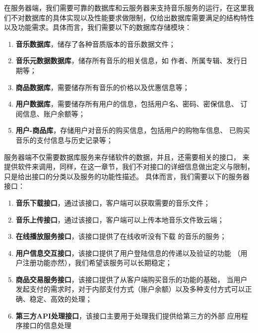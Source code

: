 在服务器端，我们需要可靠的数据库和云服务器来支持音乐服务的运行，在这里我们不对数据库的具体实现以及性能要求做限制，仅给出数据库需要满足的结构特性以及功能需求。具体而言，我们需要以下的数据库存储模块：
    \begin{enumerate}
        \item \textbf{音乐数据库}，储存了各种音质版本的音乐数据文件；
        \item \textbf{音乐元数据数据库}，储存所有音乐的相关信息，如
            作者、所属专辑、发行日期等；
        \item \textbf{商品数据库}，需要储存所有音乐的价格以及优惠信息等；
        \item \textbf{用户数据库}，需要储存所有用户的信息，包括用户名、密码、密保信息、
            订阅信息、账户余额等；
\iffalse
    \R{
        \item \textbf{用户-用户关系数据库}
                    ，存储用户与用户之间的联系，
            具体而言，储存了用户之间的社交关系，比如好友关系、关注关系、粉丝关系等。
}
\fi
        \item \textbf{用户-商品库}，存储用户对音乐的购买信息，包括用户的购物车信息、
            已购买音乐的支付信息与历史记录等；
    \end{enumerate}

服务器端不仅需要数据库服务来存储软件的数据，并且，还需要相关的接口，
    来提供软件来调用，同样，在这一章节，我们不对接口的详细信息做出定义与限制，
    只是给出接口的分类以及服务的功能性描述。
具体而言，我们需要以下的服务器接口：
\begin{enumerate}
    \item \textbf{音乐下载接口}，通过该接口，客户端可以获取需要的音乐文件；
    \item \textbf{音乐上传接口}，通过该接口，客户端可以上传本地音乐文件致云端；
\iffalse
        \R{
        介于新的需求，我们需要在下载时，进行不同音质的音乐分配。
        并且，根据用户会员的购买情况，音乐的可下载性、可下载的音质都有一定区别。
        }
\fi
    \item \textbf{在线播放服务接口}，该接口提供了在线收听没有下载
        的音乐的服务；
\iffalse
        \R{
        介于新的需求，我们同样需要在流播放的过程中进行音质的配置。
        并且，根据用户会员的购买情况，不同音质的可用性将有一定区别。
        }
\fi
    \item \textbf{用户信息交互接口}，该接口提供了用户登陆信息的传递以及验证的功能
        （用户注册功能亦然），我们希望该服务可以长期稳定；
    \item \textbf{商品交易服务接口}，该接口提供了从客户端购买音乐的功能的基础，
        当用户发起支付的需求时，对于内部支付方式（账户余额）以及多种支付方式可以正确、稳定、高效的处理；
    \item \textbf{第三方API处理接口}，该接口主要用于处理我们提供给第三方的外部
        应用程序接口的信息处理
\end{enumerate}

